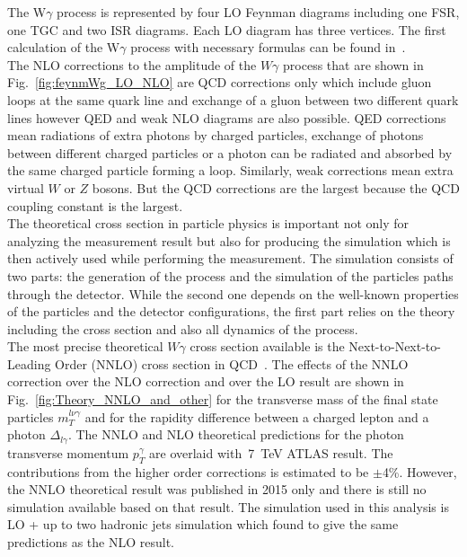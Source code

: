 The W$\gamma$ process is represented by four LO Feynman diagrams including one FSR, one TGC and two ISR diagrams. Each LO diagram has three vertices. The first calculation of the W$\gamma$ process with necessary formulas can be found in~\cite{ref_theory_LO}.\\

The NLO corrections to the amplitude of the $W\gamma$ process that are shown in Fig.~\ref{fig:feynmWg_LO_NLO} are QCD corrections only which include gluon loops at the same quark line and exchange of a gluon between two different quark lines however QED and weak NLO diagrams are also possible. QED corrections mean radiations of extra photons by charged particles, exchange of photons between different charged particles or a photon can be radiated and absorbed by the same charged particle forming a loop. Similarly, weak corrections mean extra virtual $W$ or $Z$ bosons. But the QCD corrections are the largest because the QCD coupling constant is the largest.\\

The theoretical cross section in particle physics is important not only for analyzing the measurement result but also for producing the simulation which is then actively used while performing the measurement. The simulation consists of two parts: the generation of the process and the simulation of the particles paths through the detector. While the second one depends on the well-known properties of the particles and the detector configurations, the first part relies on the theory including the cross section and also all dynamics of the process.\\

The most precise theoretical $W\gamma$ cross section available is the Next-to-Next-to-Leading Order (NNLO) cross section in QCD~\cite{ref_theory_NNLO}. The effects of the NNLO correction over the NLO correction and over the LO result are shown in Fig.~\ref{fig:Theory_NNLO_and_other} for the transverse mass of the final state particles $m_T^{l \nu \gamma}$ and for the rapidity difference between a charged lepton and a photon $\Delta_{l\gamma}$. The NNLO and NLO theoretical predictions for the photon transverse momentum $p_T^\gamma$ are overlaid with~7~TeV ATLAS result. The contributions from the higher order corrections is estimated to be $\pm$4\%. However, the NNLO theoretical result was published in 2015 only and there is still no simulation available based on that result. The simulation used in this analysis is LO + up to two hadronic jets simulation which found to give the same predictions as the NLO result.\\

